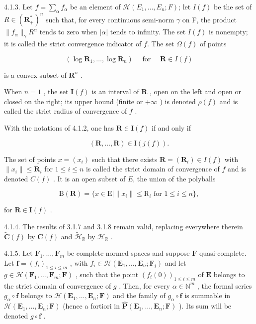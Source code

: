 4.1.3. Let \(f = \sum_{\alpha} f_{\alpha}\) be an element of \(\mathcal{H}(E_1, \ldots, E_n; F)\); let \(I(f)\) be the set of \(R \in (\mathbf{R}_+^*)^n\) such that, for every continuous semi-norm \(\gamma\) on F, the product \(\|f_{\alpha}\|_{\gamma} R^{\alpha}\) tends to zero when \(|\alpha|\) tends to infinity. The set \(I(f)\) is nonempty; it is called the strict convergence indicator of \(f\). The set \(\Omega(f)\) of points

\[
(\log \mathbf {R} _ {1}, \dots , \log \mathbf {R} _ {n}) \quad \text { for } \quad \mathbf {R} \in I (f)
\]

is a convex subset of \(\mathbf{R}^{n}\) .

When \(n=1\) , the set \(\mathbf{I}(f)\) is an interval of \(\mathbf{R}\) , open on the left and open or closed on the right; its upper bound (finite or \(+\infty\) ) is denoted \(\rho(f)\) and is called the strict radius of convergence of \(f\) .

With the notations of 4.1.2, one has \(\mathbf{R} \in \mathbf{I}(f)\) if and only if

\[
(\mathbf {R}, \dots , \mathbf {R}) \in \mathrm{I} (j (f)).
\]

The set of points \(x = (x_i)\) such that there exists \(\mathbf{R} = (\mathbf{R}_i) \in I(f)\) with \(\| x_i \| \leqslant \mathbf{R}_i\) for \(1 \leqslant i \leqslant n\) is called the strict domain of convergence of \(f\) and is denoted \(C(f)\) . It is an open subset of \(E\), the union of the polyballs

\[
\mathrm{B} (\mathbf {R}) = \{x \in \mathrm{E} | \| x _ {i} \| \leqslant \mathrm{R} _ {i} \text {   for   } 1 \leqslant i \leqslant n \},
\]

for \(\mathbf{R}\in\mathbf{I}(f)\) .

4.1.4. The results of 3.1.7 and 3.1.8 remain valid, replacing everywhere therein \(\tilde{\mathbf{C}}(f)\) by \(\mathbf{C}(f)\) and \(\tilde{\mathcal{H}}_{\mathbb{R}}\) by \(\mathcal{H}_{\mathbb{R}}\) .

4.1.5. Let \(\mathbf{F}_1, \ldots, \mathbf{F}_m\) be complete normed spaces and suppose \(\mathbf{F}\) quasi-complete. Let \(\mathbf{f} = (f_i)_{1 \leqslant i \leqslant m}\) , with \(f_i \in \mathcal{H}(\mathbf{E}_1, \ldots, \mathbf{E}_n; \mathbf{F}_i)\) and let \(g \in \mathcal{H}(\mathbf{F}_1, \ldots, \mathbf{F}_m; \mathbf{F})\) , such that the point \((f_i(0))_{1 \leqslant i \leqslant m}\) of \(\mathbf{E}\) belongs to the strict domain of convergence of \(g\) . Then, for every \(\alpha \in \mathbb{N}^m\) , the formal series \(g_\alpha \circ \mathbf{f}\) belongs to \(\mathcal{H}(\mathbf{E}_1, \ldots, \mathbf{E}_n; \mathbf{F})\) and the family of \(g_\alpha \circ \mathbf{f}\) is summable in \(\mathcal{H}(\mathbf{E}_1, \ldots, \mathbf{E}_n; \mathbf{F})\) (hence a fortiori in \(\hat{\mathbf{P}}(\mathbf{E}_1, \ldots, \mathbf{E}_n; \mathbf{F})\) ). Its sum will be denoted \(g \circ \mathbf{f}\) .

